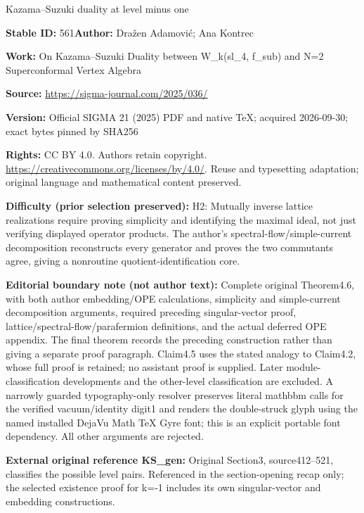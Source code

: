 \documentclass[11pt]{article}
\numberwithin{equation}{section}
\begin{document}
\begin{center}\Large Kazama–Suzuki duality at level minus one\end{center}
\noindent\textbf{Stable ID:} 561\quad\textbf{Author:} Dražen Adamović; Ana Kontrec\par
\noindent\textbf{Work:} On Kazama–Suzuki Duality between W\_k(sl\_4, f\_sub) and N=2 Superconformal Vertex Algebra\par
\noindent\textbf{Source:} \url{https://sigma-journal.com/2025/036/}\par
\noindent\textbf{Version:} Official SIGMA 21 (2025) PDF and native TeX; acquired 2026-09-30; exact bytes pinned by SHA256\par
\noindent\textbf{Rights:} CC BY 4.0. Authors retain copyright. \url{https://creativecommons.org/licenses/by/4.0/}. Reuse and typesetting adaptation; original language and mathematical content preserved.\par
\noindent\textbf{Difficulty (prior selection preserved):} {\CJKfont H2: Mutually inverse lattice realizations require proving simplicity and identifying the maximal ideal, not just verifying displayed operator products. The author’s spectral-flow/simple-current decomposition reconstructs every generator and proves the two commutants agree, giving a nonroutine quotient-identification core.}\par
\medskip\noindent\textbf{Editorial boundary note (not author text):} Complete original Theorem4.6, with both author embedding/OPE calculations, simplicity and simple-current decomposition arguments, required preceding singular-vector proof, lattice/spectral-flow/parafermion definitions, and the actual deferred OPE appendix. The final theorem records the preceding construction rather than giving a separate proof paragraph. Claim4.5 uses the stated analogy to Claim4.2, whose full proof is retained; no assistant proof is supplied. Later module-classification developments and the other-level classification are excluded. A narrowly guarded typography-only resolver preserves literal mathbbm calls for the verified vacuum/identity digit1 and renders the double-struck glyph using the named installed DejaVu Math TeX Gyre font; this is an explicit portable font dependency. All other arguments are rejected.\par
\noindent\textbf{External original reference KS\_gen:} Original Section3, source412–521, classifies the possible level pairs. Referenced in the section-opening recap only; the selected existence proof for k=-1 includes its own singular-vector and embedding constructions.\par
\end{document}
